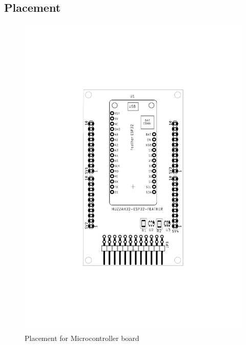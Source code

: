 \documentclass{article}
\begin{document}
      \subsection{Placement}
         \begin{figure}[H]
  	\centering
  	\includegraphics[width=1\linewidth]{mc-placement.pdf}
  	\caption{Placement for Microcontroller board}
 	 \label{fig:place3}
\end{figure}
\end{document}
